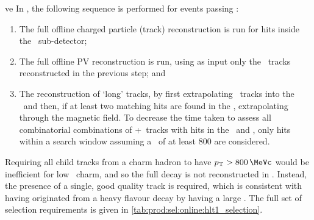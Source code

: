 ve
In \hltone, the following sequence is performed for events passing \lzero:
\begin{enumerate}
  \item The full offline charged particle (track) reconstruction is run for 
    hits inside the \velo\ sub-detector;
  \item The full offline \ac{PV} reconstruction is run, using as input only the 
    \velo\ tracks reconstructed in the previous step; and
  \item The reconstruction of `long' tracks, by first extrapolating \velo\ 
    tracks into the \ttracker\ and then, if at least two matching hits are 
    found in the \ttracker, extrapolating through the magnetic field.
    To decrease the time taken to assess all combinatorial combinations of 
    \velo+\ttracker\ tracks with hits in the \itracker\ and \otracker, only 
    hits within a search window assuming a \pT\ of at least \SI{800}{\MeVc} are 
    considered.
\end{enumerate}
Requiring all child tracks from a charm hadron to have $\pT > \SI{800}{\MeVc}$ 
would be inefficient for low \pT\ charm, and so the full decay is not 
reconstructed in \hltone.
Instead, the presence of a single, good quality track is required, which is 
consistent with having originated from a heavy flavour decay by having a large 
\ipchisq.
The full set of selection requirements is given in 
\cref{tab:prod:sel:online:hlt1_selection}.


